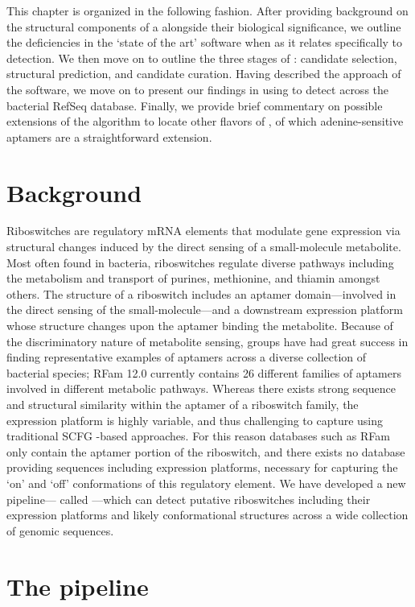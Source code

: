 This chapter is organized in the following fashion. After providing background
on the structural components of a \rb alongside their biological
significance, we outline the deficiencies in the `state of the art' software
when as it relates specifically to \rb detection. We then move on to outline
the three stages of \rfinder: candidate selection, structural prediction, and
candidate curation. Having described the approach of the software, we move on
to present our findings in using \rfinder to detect \grbs across
the bacterial RefSeq database. Finally, we provide brief commentary on possible
extensions of the algorithm to locate other flavors of \rbs, of which
adenine-sensitive aptamers are a straightforward extension.

\section{Background}
\label{sec:rfinder:bkgrnd}

Riboswitches are regulatory mRNA elements that modulate gene expression via
structural changes induced by the direct sensing of a small-molecule metabolite.
Most often found in bacteria, riboswitches regulate diverse pathways including the
metabolism and transport of purines, methionine, and thiamin amongst others. The
structure of a riboswitch includes an aptamer domain---involved in the direct
sensing of the small-molecule---and a downstream expression platform whose
structure changes upon the aptamer binding the metabolite. Because of the
discriminatory nature of metabolite sensing, groups have had great success in
finding representative examples of aptamers across a diverse collection of
bacterial species; RFam 12.0 currently contains 26 different families of aptamers
involved in different metabolic pathways. Whereas there exists strong sequence and
structural similarity within the aptamer of a riboswitch family, the expression
platform is highly variable, and thus challenging to capture using traditional SCFG
-based approaches. For this reason databases such as RFam only contain the aptamer
portion of the riboswitch, and there exists no database providing sequences
including expression platforms, necessary for capturing the `on' and `off'
conformations of this regulatory element. We have developed a new pipeline---
called \rfinder---which can detect putative riboswitches including their
expression platforms and likely conformational structures across a wide collection
of genomic sequences.

\section{The \rfinder pipeline}
\label{sec:rfinder:pipeline}

